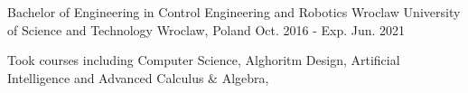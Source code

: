 
\begin{cventries}

  \cventry
    {Bachelor of Engineering in Control Engineering and Robotics} %
    {Wroclaw University of Science and Technology} %
    {Wroclaw, Poland} %
    {Oct. 2016 - Exp. Jun. 2021} %
    {
      \begin{cvitems} %
        \item {Took courses including Computer Science, Alghoritm Design, Artificial Intelligence and Advanced Calculus \& Algebra,}
      \end{cvitems}
    }

\end{cventries}
